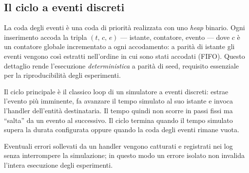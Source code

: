 \subsection{Il ciclo a eventi discreti}
\label{sec:eventloop}
La coda degli eventi \`e una coda di priorit\`a realizzata con uno \emph{heap} binario.
Ogni inserimento accoda la tripla
$(t,\, c,\, e)$ --- istante, contatore, evento --- dove $c$ \`e un contatore globale incrementato a
ogni accodamento: a parit\`a di istante gli eventi vengono cos\`i estratti
nell'ordine in cui sono stati accodati (FIFO). Questo dettaglio rende l'esecuzione
\emph{deterministica} a parit\`a di seed, requisito essenziale per la riproducibilit\`a
degli esperimenti. 

Il ciclo principale \`e il classico loop di un
simulatore a eventi discreti: estrae l'evento pi\`u imminente, fa avanzare il tempo
simulato al suo istante e invoca l'handler dell'entit\`a
destinataria. Il tempo
quindi non scorre in passi fissi ma ``salta'' da un evento al successivo.
Il ciclo termina quando il tempo simulato supera la durata configurata oppure quando la coda degli eventi rimane vuota.

Eventuali errori sollevati da un handler vengono catturati e registrati nei log senza interrompere la
simulazione; in questo modo un errore isolato non invalida l'intera esecuzione degli esperimenti.

